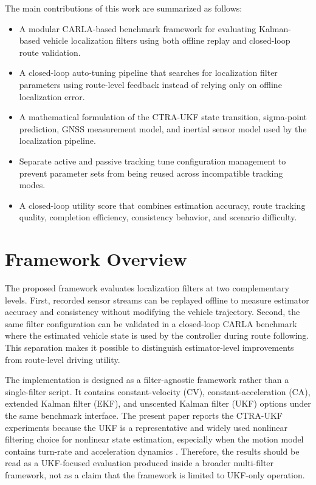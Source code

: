 \documentclass[conference]{IEEEtran}
\begin{document}
The main contributions of this work are summarized as follows:
\begin{itemize}
\item A modular CARLA-based benchmark framework for evaluating Kalman-based vehicle localization filters using both offline replay and closed-loop route validation.
\item A closed-loop auto-tuning pipeline that searches for localization filter parameters using route-level feedback instead of relying only on offline localization error.
\item A mathematical formulation of the CTRA-UKF state transition, sigma-point prediction, GNSS measurement model, and inertial sensor model used by the localization pipeline.
\item Separate active and passive tracking tune configuration management to prevent parameter sets from being reused across incompatible tracking modes.
\item A closed-loop utility score that combines estimation accuracy, route tracking quality, completion efficiency, consistency behavior, and scenario difficulty.
\end{itemize}

\section{Framework Overview}
\label{sec:framework}

The proposed framework evaluates localization filters at two complementary levels. First, recorded sensor streams can be replayed offline to measure estimator accuracy and consistency without modifying the vehicle trajectory. Second, the same filter configuration can be validated in a closed-loop CARLA benchmark where the estimated vehicle state is used by the controller during route following. This separation makes it possible to distinguish estimator-level improvements from route-level driving utility.

The implementation is designed as a filter-agnostic framework rather than a single-filter script. It contains constant-velocity (CV), constant-acceleration (CA), extended Kalman filter (EKF), and unscented Kalman filter (UKF) options under the same benchmark interface. The present paper reports the CTRA-UKF experiments because the UKF is a representative and widely used nonlinear filtering choice for nonlinear state estimation, especially when the motion model contains turn-rate and acceleration dynamics \cite{julier2004unscented,wan2000unscented}. Therefore, the results should be read as a UKF-focused evaluation produced inside a broader multi-filter framework, not as a claim that the framework is limited to UKF-only operation.
\end{document}
